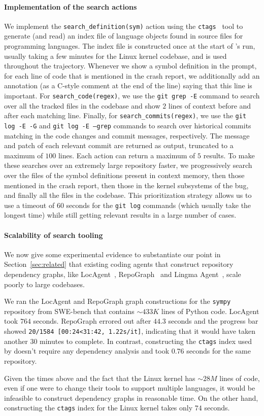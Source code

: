 \paragraph{Implementation of the search actions}
We implement the \texttt{search\_definition(sym)} action using the \texttt{ctags}~\citep{ctags} tool to generate (and read) an index file of language objects found in source files for programming languages.
The index file is constructed once at the start of \cresearcher{}'s run, usually taking a few minutes for the Linux kernel codebase, and is used throughout the \analysisphase{} trajectory.
Whenever we show a symbol definition in the prompt, for each line of code that is mentioned in the crash report, we additionally add an annotation (as a C-style comment at the end of the line) saying that this line is important.
For \texttt{search\_code(regex)}, we use the \texttt{git grep -E} command to search over all the tracked files in the codebase and show $2$ lines of context before and after each matching line.
Finally, for \texttt{search\_commits(regex)}, we use the \texttt{git log -E -G} and \texttt{git log -E --grep} commands to search over historical commits matching in the code changes and commit messages, respectively.
The message and patch of each relevant commit are returned as output, truncated to a maximum of $100$ lines.
Each action can return a maximum of $5$ results.
To make these searches over an extremely large repository faster, we progressively search over the files of the symbol definitions present in context memory, then those mentioned in the crash report, then those in the kernel subsystems of the bug, and finally all the files in the codebase.
This prioritization strategy allows us to use a timeout of $60$ seconds for the \texttt{git log} commands (which usually take the longest time) while still getting relevant results in a large number of cases.

\paragraph{Scalability of search tooling}
We now give some experimental evidence to substantiate our point in Section~\ref{sec:related} that existing coding agents that construct repository dependency graphs, like LocAgent~\citep{locagent}, RepoGraph~\citep{repograph} and Lingma Agent~\citep{lingma}, scale poorly to large codebases.

We ran the LocAgent and RepoGraph graph constructions for the \texttt{sympy} repository from SWE-bench that contains $\sim 433 K$ lines of Python code. LocAgent took $764$ seconds. RepoGraph errored out after $44.3$ seconds and the progress bar showed \texttt{20/1584 [00:24<31:42, 1.22s/it]}, indicating that it would have taken another $30$ minutes to complete. In contrast, constructing the \texttt{ctags} index used by \cresearcher{} doesn't require any dependency analysis and took 0.76 seconds for the same repository.

Given the times above and the fact that the Linux kernel has $\sim 28 M$ lines of code, even if one were to change their tools to support multiple languages, it would be infeasible to construct dependency graphs in reasonable time. On the other hand, constructing the \texttt{ctags} index for the Linux kernel takes only $74$ seconds.
